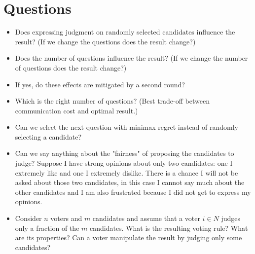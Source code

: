 \documentclass[version=3.21, pagesize, twoside=off, bibliography=totoc, DIV=calc, fontsize=12pt, a4paper]{scrartcl}
\begin{document}
\section{Questions}
\begin{itemize}
	\item Does expressing judgment on randomly selected candidates influence the result? (If we change the questions does the result change?)
	\item Does the number of questions influence the result? (If we change the number of questions does the result change?)
	\item If yes, do these effects are mitigated by a second round?
	\item Which is the right number of questions? (Best trade-off between communication cost and optimal result.)
	\item Can we select the next question with minimax regret instead of randomly selecting a candidate?
	\item Can we say anything about the "fairness" of proposing the candidates to judge? Suppose I have strong opinions about only two candidates: one I extremely like and one I extremely dislike. There is a chance I will not be asked about those two candidates, in this case I cannot say much about the other candidates and I am also frustrated because I did not get to express my opinions.
	\item Consider $n$ voters and $m$ candidates and assume that a voter $i \in N$ judges only a fraction of the $m$ candidates. What is the resulting voting rule? What are its properties? Can a voter manipulate the result by judging only some candidates? 
\end{itemize}
\end{document}
